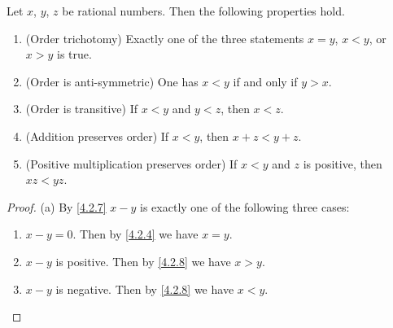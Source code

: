 \begin{proposition}\label{4.2.9}
  Let \(x\), \(y\), \(z\) be rational numbers.
  Then the following properties hold.
  \begin{enumerate}
    \item (Order trichotomy)
          Exactly one of the three statements \(x = y\), \(x < y\), or \(x > y\) is true.
    \item (Order is anti-symmetric)
          One has \(x < y\) if and only if \(y > x\).
    \item (Order is transitive)
          If \(x < y\) and \(y < z\), then \(x < z\).
    \item (Addition preserves order)
          If \(x < y\), then \(x + z < y + z\).
    \item (Positive multiplication preserves order)
          If \(x < y\) and \(z\) is positive, then \(xz < yz\).
  \end{enumerate}
\end{proposition}

\begin{proof}{(a)}
  By \cref{4.2.7} \(x - y\) is exactly one of the following three cases:
  \begin{enumerate}[label=(\Roman*)]
    \item \(x - y = 0\).
          Then by \cref{4.2.4} we have \(x = y\).
    \item \(x - y\) is positive.
          Then by \cref{4.2.8} we have \(x > y\).
    \item \(x - y\) is negative.
          Then by \cref{4.2.8} we have \(x < y\).
  \end{enumerate}
\end{proof}

